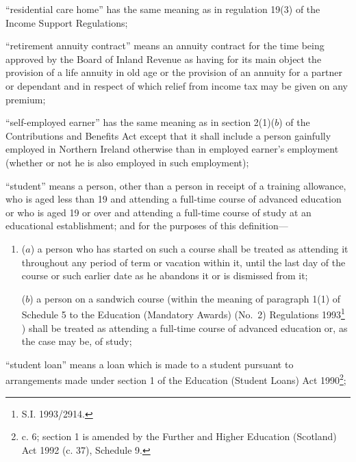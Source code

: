 \documentclass[12pt,a4paper]{article}
\begin{document}
\begin{enumerate}
“residential care home” has the same meaning as in regulation 19(3) of the Income Support Regulations;

“retirement annuity contract” means an annuity contract for the time being approved by the Board of Inland Revenue as having for its main object the provision of a life annuity in old age or the provision of an annuity for a partner or dependant and in respect of which relief from income tax may be given on any premium;

“self-employed earner” has the same meaning as in section 2(1)($b$) of the Contributions and Benefits Act
except that it shall include a person gainfully employed in Northern Ireland otherwise than in employed earner’s employment (whether or not he is also employed in such employment);  %

“student” means a person, other than a person in receipt of a training allowance, who is aged less than 19 and attending a full-time course of advanced education or who is aged 19 or over and attending a full-time course of study at an educational establishment; and for the purposes of this definition—
\begin{enumerate}\item[]
($a$)
a person who has started on such a course shall be treated as attending it throughout any period of term or vacation within it, until the last day of the course or such earlier date as he abandons it or is dismissed from it;

($b$)
a person on a sandwich course (within the meaning of paragraph 1(1) of Schedule 5 to the 
Education (Mandatory Awards) (No.\ 2) Regulations 1993\footnote{\frenchspacing S.I. 1993/2914.}%
) shall be treated as attending a full-time course of advanced education or, as the case may be, of study;
\end{enumerate}

“student loan” means a loan which is made to a student pursuant to arrangements made under section 1 of the Education (Student Loans) Act 1990\footnote{ c. 6; section 1 is amended by the Further and Higher Education (Scotland) Act 1992 (c. 37), Schedule 9.};



\end{enumerate}
\end{document}
